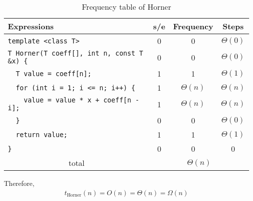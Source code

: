 \documentclass{article}
\begin{document}
\begin{table}[H]
    \centering
    \begin{tabular}{|l|c|c|c|}
        \hline
        Expressions                                     & s/e                               & Frequency   & Steps       \\
        \hline
        \verb|template <class T>|                       & 0                                 & 0           & $\Theta(0)$ \\
        \verb|T Horner(T coeff[], int n, const T &x) {| & 0                                 & 0           & $\Theta(0)$ \\
        \verb|  T value = coeff[n];|                    & 1                                 & 1           & $\Theta(1)$ \\
        \verb|  for (int i = 1; i <= n; i++) {|         & 1                                 & $\Theta(n)$ & $\Theta(n)$ \\
        \verb|    value = value * x + coeff[n - i];|    & 1                                 & $\Theta(n)$ & $\Theta(n)$ \\
        \verb|  }|                                      & 0                                 & 0           & $\Theta(0)$ \\
        \verb|  return value;|                          & 1                                 & 1           & $\Theta(1)$ \\
        \verb|}|                                        & 0                                 & 0           & 0           \\
        \hline
        \multicolumn{1}{|c|}{total}                     & \multicolumn{3}{|c|}{$\Theta(n)$}                             \\
        \hline
    \end{tabular}
    \caption{Frequency table of Horner}
\end{table}
Therefore,
\begin{align}
    \boxed{t_{\text{Horner}}(n) = O(n) = \Theta(n) = \Omega(n)}
\end{align}
\end{document}
